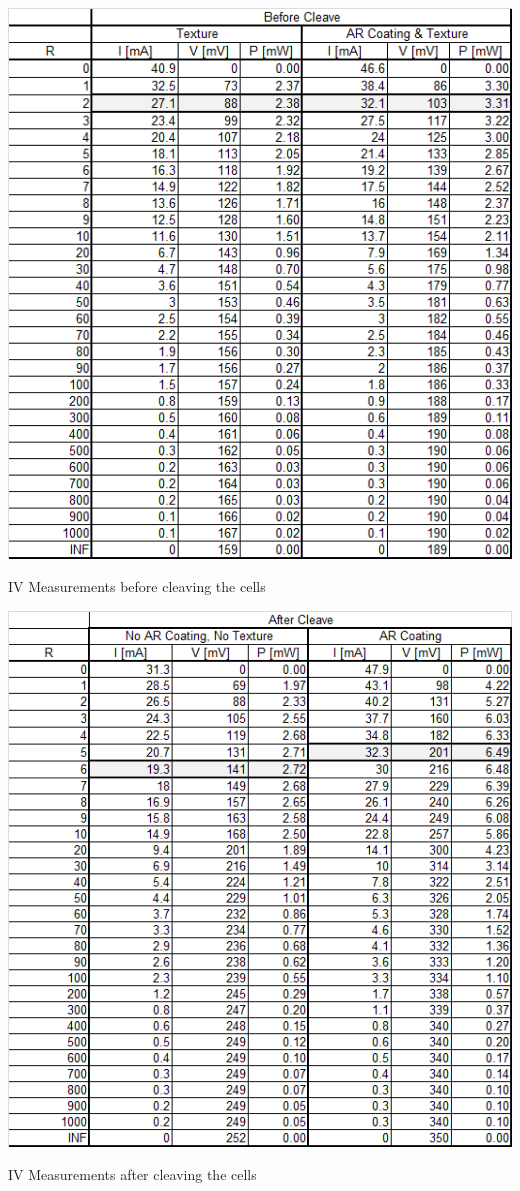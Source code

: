 \documentclass[letter,12pt]{article}
\begin{document}
	\begin{table}[h!]
		\centering
		\includegraphics[width=.9\textwidth]{./Images/Tables/Before_Cleave_2.png}
		\caption{IV Measurements before cleaving the cells}
		\label{tab:Before_Cleave_2}
	\end{table}
	
	\begin{table}[h!]
		\centering
		\includegraphics[width=.9\textwidth]{./Images/Tables/After_Cleave_1.png}
		\caption{IV Measurements after cleaving the cells}
		\label{tab:After_Cleave_1}
	\end{table}
	
\end{document}
